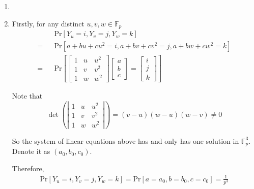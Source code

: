 \documentclass[12pt,a4]{article}
\newcounter{exercise}
\begin{document}
\begin{exercise}
	\begin{enumerate}
		\item
		\item
		
			Firstly, for any distinct $u, v, w \in \mathbb{F}_{p}$
			\begin{eqnarray*}
				&&\text{Pr}[Y_u = i, Y_v = j, Y_w = k] \\
				= &&\text{Pr}[a + bu + cu^2 = i, a + bv + cv^2 = j, a + bw + cw^2 = k] \\
				= &&\text{Pr}[
				\left[
				\begin{matrix}
					1 & u & u^2 \\
					1 & v & v^2 \\
					1 & w & w^2
				\end{matrix}
				\right]
				\left[
				\begin{matrix}
					a \\
					b \\
					c
				\end{matrix}
				\right]
				=
				\left[
				\begin{matrix}
					i \\
					j \\
					k
				\end{matrix}
				\right]
				]
			\end{eqnarray*}
			
			Note that
			\[
				\det
				\left(\left|
				\begin{matrix}
					1 & u & u^2 \\
					1 & v & v^2 \\
					1 & w & w^2
				\end{matrix}
				\right|\right)
				=
				(v - u)(w - u)(w - v)
				\neq
				0
			\]
			
			So the system of linear equations above has and only has one solution in $\mathbb{F}^{3}_{p}$.
			Denote it as $(a_0, b_0, c_0)$.
			
			Therefore,
			\begin{eqnarray*}
				\text{Pr}[Y_u = i, Y_v = j, Y_w = k]
				= \text{Pr}[a = a_0, b = b_0, c = c_0]
				= \frac{1}{p^3}
			\end{eqnarray*}
			

\end{enumerate}
\end{exercise}
\end{document}
